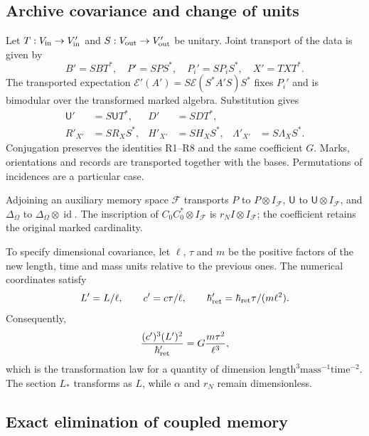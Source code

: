 \subsection{Archive covariance and change of units}

Let \(T:V_{\rm in}\to V'_{\rm in}\) and
\(S:V_{\rm out}\to V'_{\rm out}\) be unitary. Joint transport
of the data is given by
\[
 B'=SBT^*,\quad P'=SPS^*,\quad P_i'=SP_iS^*,\quad X'=TXT^*.
\]
The transported expectation
\(\mathcal E'(A')=S\mathcal E(S^*A'S)S^*\) fixes \(P_i'\)
and is bimodular over the transformed marked algebra. Substitution gives
\begin{align*}
 \mathsf U'&=S\mathsf UT^*,&D'&=SDT^*,\\
 R'_{X'}&=SR_XS^*,&H'_{X'}&=SH_XS^*,&
 \Lambda'_{X'}&=S\Lambda_XS^*.
\end{align*}
Conjugation preserves the identities R1--R8 and the same coefficient
\(G\). Marks, orientations and records are transported together
with the bases. Permutations of incidences are a particular case.

Adjoining an auxiliary memory space \(\mathcal F\) transports
\(P\) to \(P\otimes I_{\mathcal F}\), \(\mathsf U\) to
\(\mathsf U\otimes I_{\mathcal F}\), and \(\Delta_\Omega\) to
\(\Delta_\Omega\otimes\operatorname{id}\). The inscription of
\(C_0C_0^*\otimes I_{\mathcal F}\) is
\(r_N I\otimes I_{\mathcal F}\); the coefficient retains the
original marked cardinality.

To specify dimensional covariance, let \(\ell\), \(\tau\)
and \(m\) be the positive factors of the new length, time and mass
units relative to the previous ones. The numerical coordinates satisfy
\[
 L'=L/\ell,\qquad c'=c\tau/\ell,\qquad
 \hbar'_{\rm ret}=\hbar_{\rm ret}\tau/(m\ell^2).
\]
Consequently,
\[
 \frac{(c')^3(L')^2}{\hbar'_{\rm ret}}
 =G\frac{m\tau^2}{\ell^3},
\]
which is the transformation law for a quantity of dimension
\(\mathrm{length}^3\mathrm{mass}^{-1}\mathrm{time}^{-2}\).
The section \(L_*\) transforms as \(L\), while \(\alpha\)
and \(r_N\) remain dimensionless.

\subsection{Exact elimination of coupled memory}

